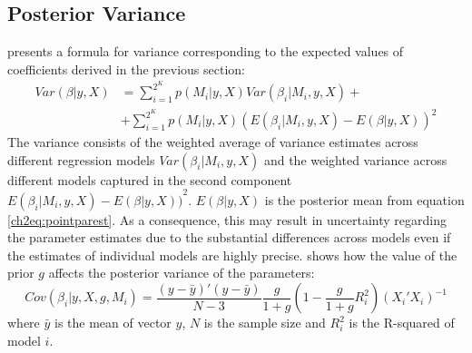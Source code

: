 \begin{refsection}
\subsection{Posterior Variance}
\textcite{MoralBenito2012} presents a formula for variance corresponding to the expected values of coefficients derived in the previous section:
\begin{equation}\label{ch2eq:postvar}
	\begin{aligned}
		Var(\beta \vert y, X) &= \sum_{i=1}^{2^{K}} p(M_{i} \vert y,X)Var(\beta_{i} \vert M_{i},y,X) + \\ 
		&+\sum_{i=1}^{2^{K}}p(M_{i} \vert y,X){(E(\beta_{i}\vert M_{i},y,X)-E(\beta \vert y, X))}^{2}
	\end{aligned}
\end{equation}
The variance consists of the weighted average of variance estimates across different regression models $Var(\beta_{i} \vert M_{i},y,X)$ and the weighted variance across different models captured in the second component ${{E(\beta_{i}\vert  M_{i},y,X)}-{E(\beta \vert y,X))}}^{2}$. $E(\beta \vert y,X)$ is the posterior mean from equation \ref{ch2eq:pointparest}. As a consequence, this may result in uncertainty regarding the parameter estimates due to the substantial differences across models even if the estimates of individual models are highly precise. \textcite{Zeugner2011} shows how the value of the prior $g$ affects the posterior variance of the parameters:
%
\begin{equation}\label{ch2eq:postvarZ}
	Cov(\beta_{i}\vert y,X,g,M_{i}) = \frac{(y-\bar{y})'(y-\bar{y})}{N-3} \frac{g}{1+g} \left( 1- \frac{g}{1+g}R_{i}^{2} \right) (X_{i}'X_{i})^{-1}
\end{equation}
where $\bar{y}$ is the mean of vector $y$, $N$ is the sample size and $R^{2}_{i}$ is the R-squared of model $i$.
%

\end{refsection}
